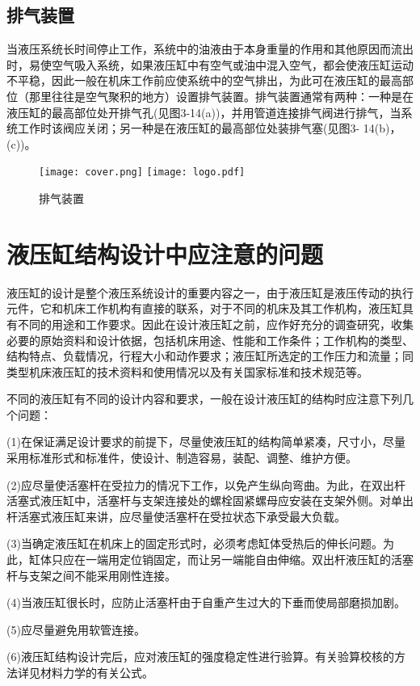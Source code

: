\subsection{排气装置}
    当液压系统长时间停止工作，系统中的油液由于本身重量的作用和其他原因而流出时，易使空气吸入系统，如果液压缸中有空气或油中混入空气，都会使液压缸运动不平稳，因此一般在机床工作前应使系统中的空气排出，为此可在液压缸的最高部位（那里往往是空气聚积的地方）设置排气装置。排气装置通常有两种：一种是在液压缸的最高部位处开排气孔(见图3-14(a))，并用管道连接排气阀进行排气，当系统工作时该阀应关闭；另一种是在液压缸的最高部位处装排气塞(见图3- 14(b)，(c))。
\begin{figure}[htbp]
\centering
\ifOpenSource
\texttt{[image: cover.png]}
\else
\texttt{[image: logo.pdf]}
\fi
\caption{排气装置}
\label{logo}
\end{figure}

\section{液压缸结构设计中应注意的问题}
    液压缸的设计是整个液压系统设计的重要内容之一，由于液压缸是液压传动的执行元件，它和机床工作机构有直接的联系，对于不同的机床及其工作机构，液压缸具有不同的用途和工作要求。因此在设计液压缸之前，应作好充分的调查研究，收集必要的原始资料和设计依据，包括机床用途、性能和工作条件；工作机构的类型、结构特点、负载情况，行程大小和动作要求；液压缸所选定的工作压力和流量；同类型机床液压缸的技术资料和使用情况以及有关国家标准和技术规范等。

    不同的液压缸有不同的设计内容和要求，一般在设计液压缸的结构时应注意下列几个问题：

(1)在保证满足设计要求的前提下，尽量使液压缸的结构简单紧凑，尺寸小，尽量采用标准形式和标准件，使设计、制造容易，装配、调整、维护方便。

(2)应尽量使活塞杆在受拉力的情况下工作，以免产生纵向弯曲。为此，在双出杆活塞式液压缸中，活塞杆与支架连接处的螺栓固紧螺母应安装在支架外侧。对单出杆活塞式液压缸来讲，应尽量使活塞杆在受拉状态下承受最大负载。

(3)当确定液压缸在机床上的固定形式时，必须考虑缸体受热后的伸长问题。为此，缸体只应在一端用定位销固定，而让另一端能自由伸缩。双出杆液压缸的活塞杆与支架之间不能采用刚性连接。

(4)当液压缸很长时，应防止活塞杆由于自重产生过大的下垂而使局部磨损加剧。

(5)应尽量避免用软管连接。

(6)液压缸结构设计完后，应对液压缸的强度稳定性进行验算。有关验算校核的方法详见材料力学的有关公式。
